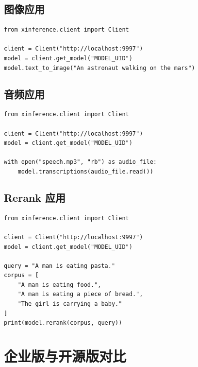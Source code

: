 \documentclass[12pt,UTF8]{ctexbook}
\begin{document}
\section{图像应用}
\label{sec:image_apps}

\begin{lstlisting}
from xinference.client import Client

client = Client("http://localhost:9997")
model = client.get_model("MODEL_UID")
model.text_to_image("An astronaut walking on the mars")
\end{lstlisting}

\section{音频应用}
\label{sec:audio_apps}

\begin{lstlisting}
from xinference.client import Client

client = Client("http://localhost:9997")
model = client.get_model("MODEL_UID")

with open("speech.mp3", "rb") as audio_file:
    model.transcriptions(audio_file.read())
\end{lstlisting}

\section{Rerank 应用}
\label{sec:rerank_apps}

\begin{lstlisting}
from xinference.client import Client

client = Client("http://localhost:9997")
model = client.get_model("MODEL_UID")

query = "A man is eating pasta."
corpus = [
    "A man is eating food.",
    "A man is eating a piece of bread.",
    "The girl is carrying a baby."
]
print(model.rerank(corpus, query))
\end{lstlisting}

\chapter{企业版与开源版对比}
\label{chap:enterprise_vs_open}
\end{document}

